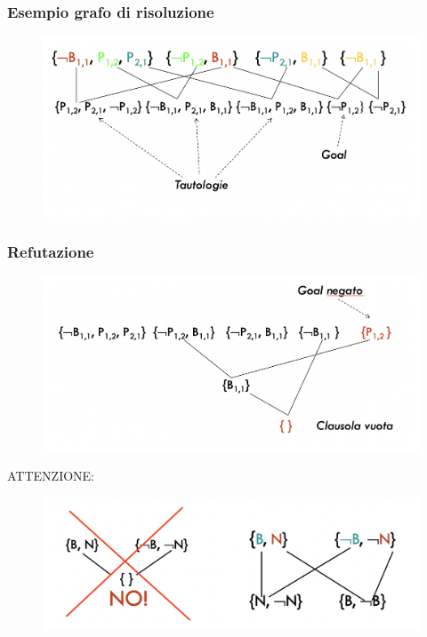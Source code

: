 \documentclass{article}
\begin{document}
\subsubsection{Esempio grafo di risoluzione}
\begin{figure}[H]
\centering
\includegraphics[scale=0.5]{Images/esgraforisoluzione.png}
\end{figure}
\subsubsection{Refutazione}
\begin{figure}[H]
\centering
\includegraphics[scale=0.5]{Images/refutazione.png}
\end{figure}
ATTENZIONE:
\begin{figure}[H]
\centering
\includegraphics[scale=0.4]{Images/danger.png}
\end{figure}
\end{document}

